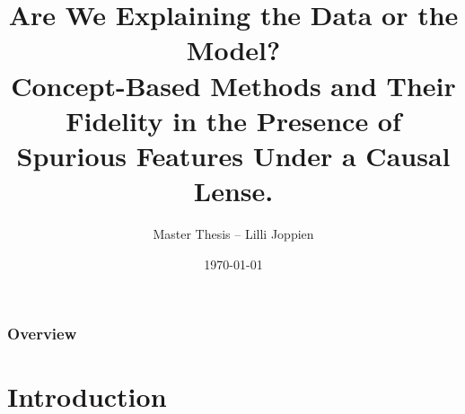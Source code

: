 \documentclass[German, aspectratio=169]{beamer}
\title[Master Thesis Defense]{Are We Explaining the Data or the Model? \\ \large{Concept-Based Methods and Their Fidelity in the Presence of Spurious Features Under a Causal Lense.}
} %
\author{Master Thesis -- Lilli Joppien} %
\date{\today} %
\institute[Freie Universität Berlin] %
{

Freie Universität Berlin Department of Mathematics and Computer Science\\ 
In Cooperation with the research group Climate Informatics / Causal Inference \\ (TU Berlin / DLR Jena / TU Dresden)

\medskip
\textit{Advisers: Oana-Iuliana Popescu, Simon Bing\\
First Examiner: Prof. Dr. Jakob Runge\\
Second Examiner: Prof. Dr. Grégoire Montavon} 
}
\begin{document}
\begin{frame}
    \titlepage %
\end{frame}
\begin{frame}
    \frametitle{Overview} %
    \tableofcontents[hideallsubsections] %
\end{frame}

\section[Introduction]{Introduction}
\end{document}
